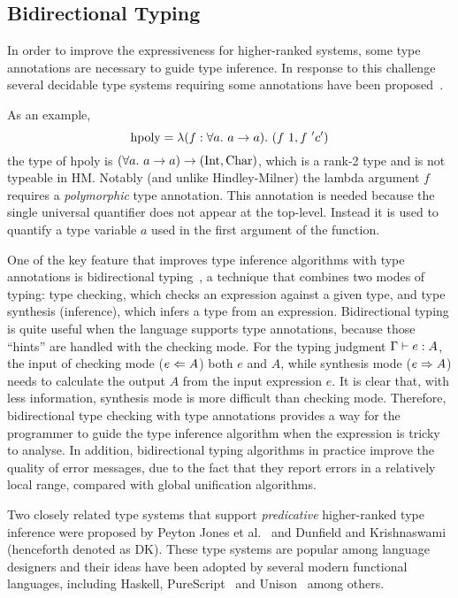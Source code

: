 \subsection{Bidirectional Typing}

In order to improve the expressiveness for higher-ranked systems,
some type annotations are necessary to guide type inference.
In response to this challenge several decidable type systems requiring some annotations 
have been proposed~\citep{dunfield2013complete,
jones2007practical,Serrano2018,le2003ml,leijen2008hmf,vytiniotis2008fph}.

As an example,
$$\text{hpoly} = \lam[(f:\all a \to a)] (f~1, f~'c')$$
the type of $\text{hpoly}$ is $(\all a \to a) \to (\text{Int}, \text{Char})$,
which is a rank-2 type and is not typeable in HM.
Notably (and unlike Hindley-Milner) the lambda argument $f$ requires a
\emph{polymorphic} type annotation.
This annotation is needed because the single universal quantifier
does not appear at the top-level. Instead it is used to quantify a
type variable $a$ used in the first argument of the function.

One of the key feature that improves type inference algorithms with type annotations
is bidirectional typing~\citep{pierce:local}, a technique that combines two modes of typing:
type checking, which checks an expression against a given type,
and type synthesis (inference), which infers a type from an expression.
Bidirectional typing is quite useful when the language supports type annotations,
because those ``hints'' are handled with the checking mode.
For the typing judgment $\Gamma \vdash e : A$,
the input of checking mode ($e \Leftarrow A$) both $e$ and $A$,
while synthesis mode ($e \Rightarrow A$)
needs to calculate the output $A$ from the input expression $e$.
It is clear that, with less information,
synthesis mode is more difficult than checking mode.
Therefore, bidirectional type checking with type annotations
provides a way for the programmer to guide
the type inference algorithm when the expression is tricky to analyse.
In addition, bidirectional typing algorithms in practice improve the quality of error messages,
due to the fact that they report errors in a relatively local range,
compared with global unification algorithms.

Two closely related type systems that 
support \emph{predicative} higher-ranked type inference were proposed 
by Peyton Jones et al.~\citep{jones2007practical} and Dunfield and
Krishnaswami~\citep{dunfield2013complete} (henceforth denoted as DK). 
These type systems are
popular among language designers and their ideas have been adopted by
several modern functional languages, including Haskell, PureScript~\citep{PureScript} and
Unison~\citep{Unison} among others.

